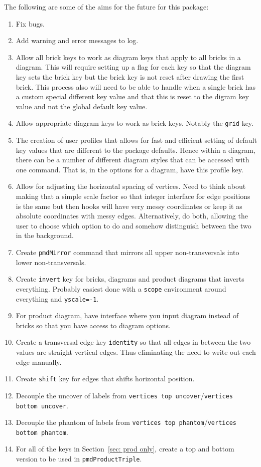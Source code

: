 \documentclass{ltxdoc}
\begin{document}
The following are some of the aims for the future for this package:
\begin{enumerate}
    \item Fix bugs.
    \item Add warning and error messages to log.
    \item Allow all brick keys to work as diagram keys that apply to all bricks in a diagram. This will require setting up a flag for each key so that the diagram key sets the brick key but the brick key is not reset after drawing the first brick. This process also will need to be able to handle when a single brick has a custom special different key value and that this is reset to the digram key value and not the global default key value.
    \item Allow appropriate diagram keys to work as brick keys. Notably the \texttt{grid} key.
    \item The creation of user profiles that allows for fast and efficient setting of default key values that are different to the package defaults. Hence within a diagram, there can be a number of different diagram styles that can be accessed with one command. That is, in the options for a diagram, have this profile key.
    \item Allow for adjusting the horizontal spacing of vertices. Need to think about making that a simple scale factor so that integer interface for edge positions is the same but then hooks will have very messy coordinates or keep it as absolute coordinates with messy edges. Alternatively, do both, allowing the user to choose which option to do and somehow distinguish between the two in the background.
    \item Create \texttt{pmdMirror} command that mirrors all upper non-transversals into lower non-transversals.
    \item Create \texttt{invert} key for bricks, diagrams and product diagrams that inverts everything. Probably easiest done with a \texttt{scope} environment around everything and \texttt{yscale=-1}.
    \item For product diagram, have interface where you input diagram instead of bricks so that you have access to diagram options.
    \item Create a transversal edge key \texttt{identity} so that all edges in between the two values are straight vertical edges. Thus eliminating the need to write out each edge manually.
    \item Create \texttt{shift} key for edges that shifts horizontal position.
    \item Decouple the uncover of labels from \texttt{vertices top uncover}/\texttt{vertices bottom uncover}.
    \item Decouple the phantom of labels from \texttt{vertices top phantom}/\texttt{vertices bottom phantom}.
    \item For all of the keys in Section~\ref{sec: prod only}, create a top and bottom version to be used in \texttt{pmdProductTriple}.
\end{enumerate}
\end{document}
